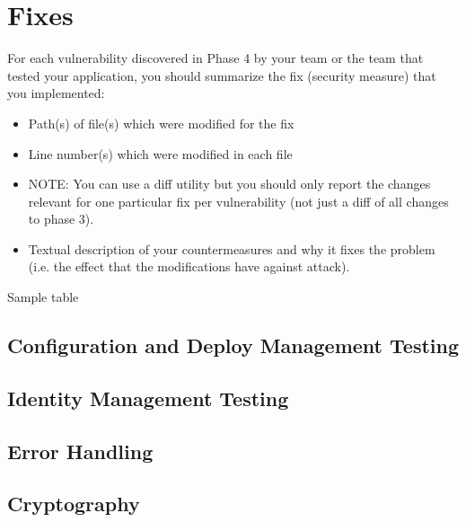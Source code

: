 \chapter{Fixes}\label{chapter:fixes}

For each vulnerability discovered in Phase 4 by your team or the team that tested your
application, you should summarize the fix (security measure) that you implemented:
\begin{itemize}
	\item Path(s) of file(s) which were modified for the fix
	\item Line number(s) which were modified in each file 
	\item NOTE: You can use a diff utility but you should only report the changes relevant for one particular fix per vulnerability (not just a diff of all changes to phase 3).
	\item Textual description of your countermeasures and why it fixes the problem (i.e. the effect that the modifications have against attack).
\end{itemize}

Sample table
\fixtable{%
}{%
}{%
}{%
}{%
}

\section{Configuration and Deploy Management Testing}

\clearpage
\section{Identity Management Testing}

\clearpage
\section{Error Handling}

\clearpage
\section{Cryptography}


